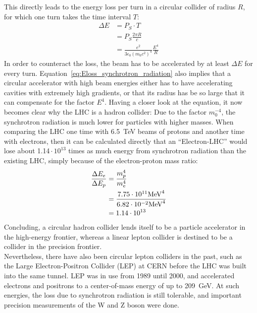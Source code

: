 This directly leads to the energy loss per turn in a circular collider of radius $R$, for which one turn takes the time interval $T$:
\begin{align}
 \Delta E &= P_S\cdot T\\
 &= P_S\frac{2\pi R}{c}\\
 &=\frac{e^2}{3\epsilon_0(m_0c^2)^4}\frac{E^4}{R} \label{eq:Eloss_synchrotron_radiation}
\end{align}
In order to counteract the loss, the beam has to be accelerated by at least $\Delta E$ for every turn.
Equation~\ref{eq:Eloss_synchrotron_radiation} also implies that a circular accelerator with high beam energies either has to have accelerating cavities with extremely high gradients, or that its radius has be so large that it can compensate for the factor $E^4$.
Having a closer look at the equation, it now becomes clear why the LHC is a hadron collider:
Due to the factor $m_0^{-4}$, the synchrotron radiation is much lower for particles with higher masses.
When comparing the LHC one time with \SI{6.5}{\TeV} beams of protons and another time with electrons, then it can be calculated directly that an ``Electron-LHC'' would lose about 1.14\,$\cdot\,10^{13}$ times as much energy from synchrotron radiation than the existing LHC, simply because of the electron-proton mass ratio:
\begin{align*}
 \frac{\Delta E_e}{\Delta E_p} &=\frac{m_p^4}{m_e^4}\\
 &= \frac{7.75\cdot10^{11} \textnormal{MeV}^4}{6.82\cdot10^{-2} \textnormal{MeV}^4}\\
 &=1.14\cdot10^{13}
\end{align*}
Concluding, a circular hadron collider lends itself to be a particle accelerator in the high-energy frontier, whereas a linear lepton collider is destined to be a collider in the precision frontier.
\\
Nevertheless, there have also been circular lepton colliders in the past, such as the Large Electron-Positron Collider (LEP) at CERN before the LHC was built into the same tunnel.
LEP was in use from 1989 until 2000, and accelerated electrons and positrons to a center-of-mass energy of up to \SI{209}{\GeV}.
At such energies, the loss due to synchrotron radiation is still tolerable, and important precision measurements of the W and Z boson were done.

